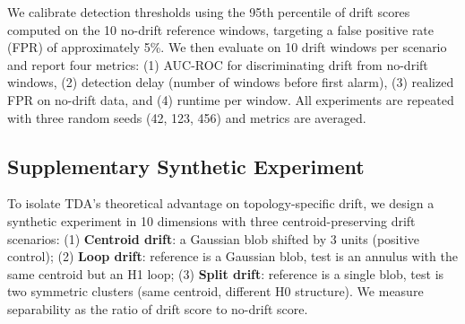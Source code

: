 We calibrate detection thresholds using the 95th percentile of drift scores computed on the 10 no-drift reference windows, targeting a false positive rate (FPR) of approximately 5\%. We then evaluate on 10 drift windows per scenario and report four metrics: (1) AUC-ROC for discriminating drift from no-drift windows, (2) detection delay (number of windows before first alarm), (3) realized FPR on no-drift data, and (4) runtime per window. All experiments are repeated with three random seeds (42, 123, 456) and metrics are averaged.

\subsection{Supplementary Synthetic Experiment}
\label{sec:synthetic}

To isolate TDA's theoretical advantage on topology-specific drift, we design a synthetic experiment in 10 dimensions with three centroid-preserving drift scenarios: (1) \textbf{Centroid drift}: a Gaussian blob shifted by 3 units (positive control); (2) \textbf{Loop drift}: reference is a Gaussian blob, test is an annulus with the same centroid but an H1 loop; (3) \textbf{Split drift}: reference is a single blob, test is two symmetric clusters (same centroid, different H0 structure). We measure separability as the ratio of drift score to no-drift score.
